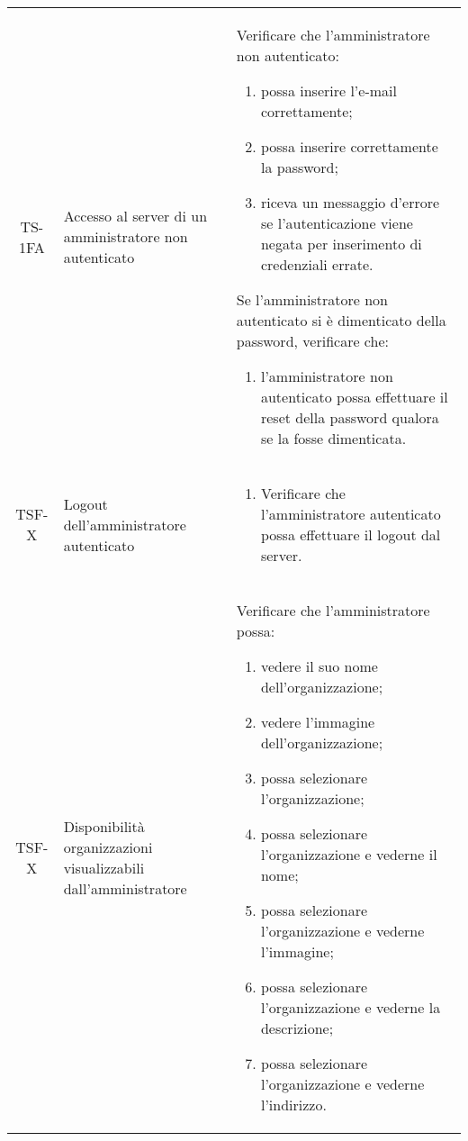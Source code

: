 {\begin{longtable}{ c | C{3cm} | C{11cm} }
TS-1FA & Accesso al server di un amministratore non autenticato & 
Verificare che l'amministratore non autenticato:
\begin{enumerate}
    \item possa inserire l'e-mail correttamente;
    \item possa inserire correttamente la password;
    \item riceva un messaggio d'errore se l'autenticazione viene negata per inserimento di credenziali errate.
\end{enumerate}
Se l'amministratore non autenticato si è dimenticato della password, verificare che:
\begin{enumerate}
    \item l'amministratore non autenticato possa effettuare il reset della password qualora se la fosse dimenticata.
\end{enumerate} \\

TSF-X & Logout dell'amministratore autenticato & \begin{enumerate}
    \item Verificare che l'amministratore autenticato possa effettuare il logout dal server.
\end{enumerate} \\

TSF-X & Disponibilità organizzazioni visualizzabili dall'amministratore &
Verificare che l'amministratore possa:
\begin{enumerate}
    \item vedere il suo nome dell'organizzazione;
    \item vedere l'immagine dell'organizzazione;
    \item possa selezionare l'organizzazione;
    \item possa selezionare l'organizzazione e vederne il nome;
    \item possa selezionare l'organizzazione e vederne l'immagine;
    \item possa selezionare l'organizzazione e vederne la descrizione;
    \item possa selezionare l'organizzazione e vederne l'indirizzo.
\end{enumerate} \\


\end{longtable}}
